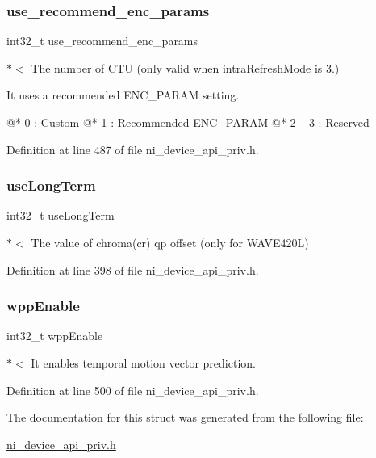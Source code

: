 \subsubsection{\texorpdfstring{use\_recommend\_enc\_params}{use\_recommend\_enc\_params}}
{\footnotesize\ttfamily int32\+\_\+t use\+\_\+recommend\+\_\+enc\+\_\+params}

$\ast$$<$ The number of C\+TU (only valid when intra\+Refresh\+Mode is 3.)


\begin{DoxyItemize}
\item \begin{DoxyVerb}It uses a recommended ENC_PARAM setting.

@* 0 : Custom
@* 1 : Recommended ENC_PARAM
@* 2 ~ 3  : Reserved
\end{DoxyVerb}
 
\end{DoxyItemize}

Definition at line 487 of file ni\+\_\+device\+\_\+api\+\_\+priv.\+h.

\mbox{\label{struct__ni__encoder__change__params__t_afac63ffa92d30f1e84f75b9ee71098f9}} 
\subsubsection{\texorpdfstring{useLongTerm}{useLongTerm}}
{\footnotesize\ttfamily int32\+\_\+t use\+Long\+Term}

$\ast$$<$ The value of chroma(cr) qp offset (only for W\+A\+V\+E420L) 

Definition at line 398 of file ni\+\_\+device\+\_\+api\+\_\+priv.\+h.

\mbox{\label{struct__ni__encoder__change__params__t_a869f52b6d5d81b354874776365772d9a}} 
\subsubsection{\texorpdfstring{wppEnable}{wppEnable}}
{\footnotesize\ttfamily int32\+\_\+t wpp\+Enable}

$\ast$$<$ It enables temporal motion vector prediction. 

Definition at line 500 of file ni\+\_\+device\+\_\+api\+\_\+priv.\+h.



The documentation for this struct was generated from the following file\+:\begin{DoxyCompactItemize}
\item 
\mbox{\hyperlink{ni__device__api__priv_8h}{ni\+\_\+device\+\_\+api\+\_\+priv.\+h}}\end{DoxyCompactItemize}
